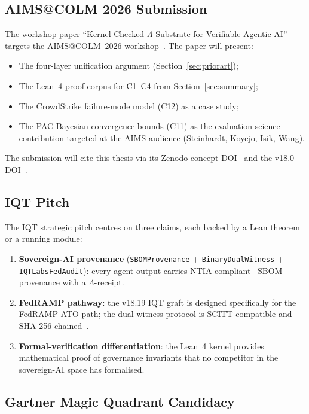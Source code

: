 \subsection{AIMS@COLM 2026 Submission}

The workshop paper ``Kernel-Checked \(\Lambda\)-Substrate for Verifiable
Agentic AI'' targets the AIMS@COLM~2026 workshop~\cite{aims2026colm}.
The paper will present:
\begin{itemize}
  \item The four-layer unification argument (Section~\ref{sec:priorart});
  \item The Lean~4 proof corpus for C1--C4 from Section~\ref{sec:summary};
  \item The CrowdStrike failure-mode model (C12) as a case study;
  \item The PAC-Bayesian convergence bounds (C11) as the evaluation-science
    contribution targeted at the AIMS audience (Steinhardt, Koyejo, Isik,
    Wang).
\end{itemize}

The submission will cite this thesis via its Zenodo concept
DOI~\cite{lutar2026concept} and the v18.0 DOI~\cite{lutar2026v18}.

\subsection{IQT Pitch}

The IQT strategic pitch centres on three claims, each backed by a Lean
theorem or a running module:

\begin{enumerate}
  \item \textbf{Sovereign-AI provenance} (\texttt{SBOMProvenance} +
    \texttt{BinaryDualWitness} + \texttt{IQTLabsFedAudit}): every agent
    output carries NTIA-compliant~\cite{ntia2021sbom} SBOM provenance with
    a \(\Lambda\)-receipt.
  \item \textbf{FedRAMP pathway}: the v18.19 IQT graft is designed
    specifically for the FedRAMP ATO path; the dual-witness protocol is
    SCITT-compatible and SHA-256-chained~\cite{nist2012sha}.
  \item \textbf{Formal-verification differentiation}: the Lean~4 kernel
    provides mathematical proof of governance invariants that no
    competitor in the sovereign-AI space has formalised.
\end{enumerate}

\subsection{Gartner Magic Quadrant Candidacy}

